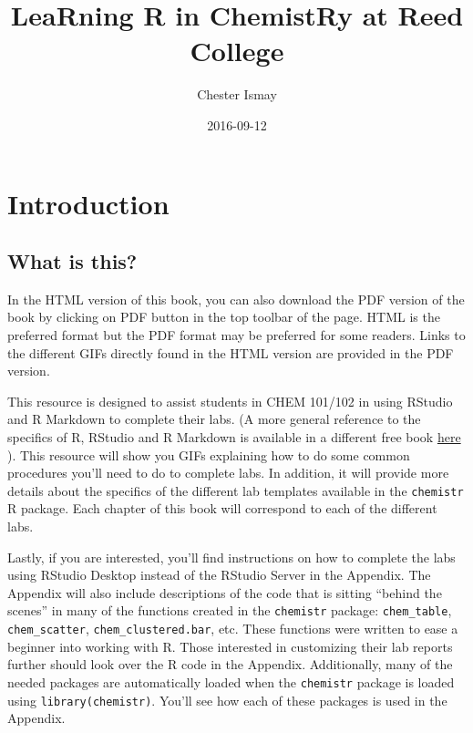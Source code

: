 \documentclass[]{tufte-book}
\title{LeaRning R in ChemistRy at Reed College}
\author{Chester Ismay}
\date{2016-09-12}
\begin{document}
\maketitle



{
\setcounter{tocdepth}{1}
\tableofcontents
}

\chapter*{Introduction}\label{introduction}

\section*{What is this?}\label{what-is-this}

In the HTML version of this book, you can also download the PDF version
of the book by clicking on PDF button in the top toolbar of the page.
HTML is the preferred format but the PDF format may be preferred for
some readers. Links to the different GIFs directly found in the HTML
version are provided in the PDF version.

This resource is designed to assist students in CHEM 101/102 in using
RStudio and R Markdown to complete their labs. (A more general reference
to the specifics of R, RStudio and R Markdown is available in a
different free book \href{http://ismayc.github.io/rbasics-book}{here}
\citep{usedtor2016}). This resource will show you GIFs explaining how to
do some common procedures you'll need to do to complete labs. In
addition, it will provide more details about the specifics of the
different lab templates available in the \texttt{chemistr} R package.
Each chapter of this book will correspond to each of the different labs.

Lastly, if you are interested, you'll find instructions on how to
complete the labs using RStudio Desktop instead of the RStudio Server in
the Appendix. The Appendix will also include descriptions of the code
that is sitting ``behind the scenes'' in many of the functions created
in the \texttt{chemistr} package: \texttt{chem\_table},
\texttt{chem\_scatter}, \texttt{chem\_clustered.bar}, etc. These
functions were written to ease a beginner into working with R. Those
interested in customizing their lab reports further should look over the
R code in the Appendix. Additionally, many of the needed packages are
automatically loaded when the \texttt{chemistr} package is loaded using
\texttt{library(chemistr)}. You'll see how each of these packages is
used in the Appendix.
\end{document}
